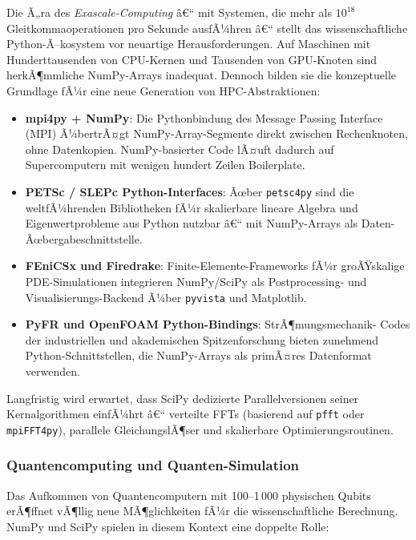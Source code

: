 \documentclass[12pt, a4paper]{article}
\begin{document}
Die Ã„ra des \emph{Exascale-Computing} â€“ mit Systemen, die mehr als
$10^{18}$ Gleitkommaoperationen pro Sekunde ausfÃ¼hren â€“ stellt das
wissenschaftliche Python-Ã–kosystem vor neuartige Herausforderungen.
Auf Maschinen mit Hunderttausenden von CPU-Kernen und Tausenden von
GPU-Knoten sind herkÃ¶mmliche NumPy-Arrays inadequat. Dennoch bilden sie
die konzeptuelle Grundlage fÃ¼r eine neue Generation von HPC-Abstraktionen:

\begin{itemize}
  \item \textbf{mpi4py + NumPy}: Die Pythonbindung des Message Passing
    Interface (MPI) Ã¼bertrÃ¤gt NumPy-Array-Segmente direkt zwischen
    Rechenknoten, ohne Datenkopien. NumPy-basierter Code lÃ¤uft dadurch
    auf Supercomputern mit wenigen hundert Zeilen Boilerplate.

  \item \textbf{PETSc / SLEPc Python-Interfaces}: Ãœber \texttt{petsc4py}
    sind die weltfÃ¼hrenden Bibliotheken fÃ¼r skalierbare lineare Algebra
    und Eigenwertprobleme aus Python nutzbar â€“ mit NumPy-Arrays als
    Daten-Ãœbergabeschnittstelle.

  \item \textbf{FEniCSx und Firedrake}: Finite-Elemente-Frameworks fÃ¼r
    groÃŸskalige PDE-Simulationen integrieren NumPy/SciPy als Postprocessing-
    und Visualisierungs-Backend Ã¼ber \texttt{pyvista} und Matplotlib.

  \item \textbf{PyFR und OpenFOAM Python-Bindings}: StrÃ¶mungsmechanik-
    Codes der industriellen und akademischen Spitzenforschung bieten
    zunehmend Python-Schnittstellen, die NumPy-Arrays als primÃ¤res
    Datenformat verwenden.
\end{itemize}

Langfristig wird erwartet, dass SciPy dedizierte Parallelversionen
seiner Kernalgorithmen einfÃ¼hrt â€“ verteilte FFTs (basierend auf
\texttt{pfft} oder \texttt{mpiFFT4py}), parallele GleichungslÃ¶ser
und skalierbare Optimierungsroutinen.

\subsubsection{Quantencomputing und Quanten-Simulation}
\label{subsubsec:quantum}

Das Aufkommen von Quantencomputern mit 100--1\,000 physischen Qubits
erÃ¶ffnet vÃ¶llig neue MÃ¶glichkeiten fÃ¼r die wissenschaftliche Berechnung.
NumPy und SciPy spielen in diesem Kontext eine doppelte Rolle:
\end{document}
